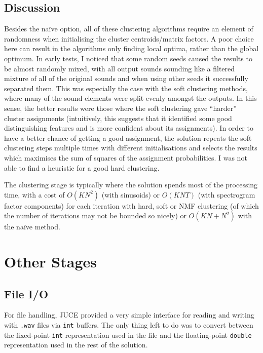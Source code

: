 \documentclass[12pt,a4paper,twoside,openright]{report}
\begin{document}
\subsection{Discussion}

Besides the na\"{i}ve option, all of these clustering algorithms require an element of randomness when initialising the cluster centroids/matrix factors. A poor choice here can result in the algorithms only finding local optima, rather than the global optimum. In early tests, I noticed that some random seeds caused the results to be almost randomly mixed, with all output sounds sounding like a filtered mixture of all of the original sounds and when using other seeds it successfully separated them. This was especially the case with the soft clustering methods, where many of the sound elements were split evenly amongst the outputs. In this sense, the better results were those where the soft clustering gave ``harder'' cluster assignments (intuitively, this suggests that it identified some good distinguishing features and is more confident about its assignments). In order to have a better chance of getting a good assignment, the solution repeats the soft clustering steps multiple times with different initialisations and selects the results which maximises the sum of squares of the assignment probabilities. I was not able to find a heuristic for a good hard clustering.

The clustering stage is typically where the solution spends most of the processing time, with a cost of $ O(KN^2) $ (with sinusoids) or $ O(KNT) $ (with spectrogram factor components) for each iteration with hard, soft or NMF clustering (of which the number of iterations may not be bounded so nicely) or $ O(KN + N^2) $ with the na\"{i}ve method.

\section{Other Stages}

\subsection{File I/O}

For file handling, JUCE provided a very simple interface for reading and writing with \texttt{.wav} files via \texttt{int} buffers. The only thing left to do was to convert between the fixed-point \texttt{int} representation used in the file and the floating-point \texttt{double} representation used in the rest of the solution.
\end{document}
